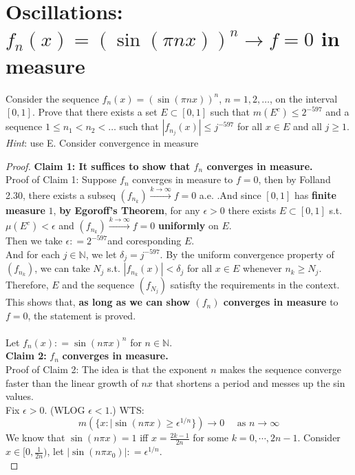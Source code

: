 \documentclass[lang=cn,11pt]{elegantbook}
\begin{document}
\section{Oscillations:  $f_n(x)=(\sin(\pi n x))^n \to f = 0$ in measure}
  Consider the sequence $f_n(x)=(\sin(\pi n x))^n$, $n=1,2,\dots$, on the interval $[0,1]$. Prove that there exists a set $E\subset[0,1]$ such that $m(E^c)\le 2^{-597}$ and a sequence $1\le n_1<n_2<\dots$ such that $|f_{n_j}(x)|\le j^{-597}$ for all $x\in E$ and all $j\ge1$. \textit{Hint}: use E. Consider convergence in measure
\begin{proof}
\textbf{Claim 1: It suffices to show that $f_n $ converges in measure.}\\
Proof of Claim 1: Suppose $f_n $ converges in measure to $f = 0$, then by Folland 2.30, there exists a subseq $(f_{n_k}) \overset{k \to \infty}{\longrightarrow} f= 0$ a.e. .And since $[0,1]$ has \textbf{finite measure} $1$, \textbf{by Egoroff's Theorem},  for any $\epsilon>0$ there exists $E \subset [0,1]$ s.t. $\mu(E^c) < \epsilon$ and $(f_{n_k}) \overset{k \to \infty}{\longrightarrow} f= 0$ \textbf{uniformly} on $E$. \\
Then we take $\epsilon : = 2^{-597}$and coresponding $E$.\\
And for each $j \in \mathbb{N}$, we let $\delta_j = j^{-597}$. By the uniform convergence property of $(f_{n_k})$, we can take $N_j$ s.t. $|f_{n_k}(x)| < \delta_j $ for all $x \in E$ whenever $n_k \geq N_j$.\\
Therefore, $E$ and the sequence $(f_{N_j})$  satisfty the requirements in the context.\\
This shows that, \textbf{as long as we can show $(f_n)$ converges in measure} to $f = 0$, the statement is proved.\\\\
Let $f_n (x) : = \sin( n\pi x)^n $ for $n\in \mathbb{N}$.\\
\textbf{Claim 2:} $f_n $ \textbf{converges in measure.}\\
Proof of Claim 2: The idea is that the exponent $n$ makes the sequence converge faster than the linear growth of $nx$ that shortens a period and messes up the sin values.\\ 
Fix $\epsilon  > 0$. (WLOG $\epsilon < 1$.) WTS: \[
m(\{ x: |\sin (n \pi x) \geq \epsilon^{1/n}  \}) \to 0 \quad \text{ as } n\to \infty
\]
We know that $\sin(n\pi x) = 1$ iff $x = \frac{2k-1}{2n}$ for some $k = 0,\cdots, 2n-1$.
Consider $x \in [0,\frac{1}{2n})$, let $|\sin(n \pi x_0 ) | : = \epsilon^{1/n}$.\\

\end{proof}
\end{document}
